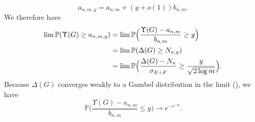 \documentclass[10pt,journal,compsoc]{IEEEtran}
\theoremstyle{definition}
\begin{document}
\begin{IEEEproof}[Lemma~8]
\begin{equation*}
   a_{n,m,y} = a_{n,m} + (y + o(1)) b_{n,m}.
\end{equation*}
We therefore have
\begin{equation*}
  \begin{split}
  \lim \mathbb{P}(\Upsilon(G) \geq a_{n,m,y}) &= 
  \lim \mathbb{P}\Bigl(\frac{\Upsilon(G) - a_{n,m}}{b_{n,m}} \geq y \Bigr) \\
  &= \lim \mathbb{P}(\Delta(G) \geq N_{\kappa,y}) \\
  &= \lim \mathbb{P}\Bigl(\frac{\Delta(G) -
    N_{\kappa}}{\sigma_{E+F}} \geq \frac{y}{\sqrt{2 \log{m}}} \Bigr). \\
  \end{split}
\end{equation*}
Because $\Delta(G)$ converges weakly to a Gumbel
distribution in the limit
(\cite{bollobas85:_random_graph,rukhin12}),
we have
\begin{equation}
  \label{eq:47}
  \mathbb{P}\Big(\frac{\Upsilon(G) - a_{n,m}}{b_{n,m}} \leq
    y\Bigr) \rightarrow e^{- e^{-y}}.
\end{equation}
\end{IEEEproof}

\end{document}
